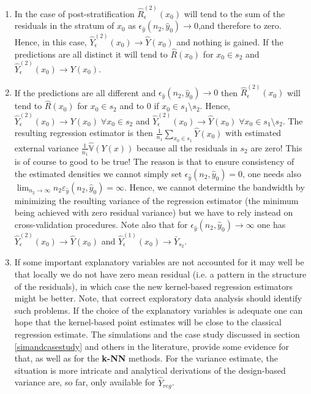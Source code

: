 \documentclass[a4paper,12pt,leqno, titlepage]{article}
\newcommand{\VAR}{\mathbb{V}}
\begin{document}
 \begin{enumerate}
 \item
 In the case of post-stratification $\hat{R}^{(2)}_{\epsilon}(x_0)$ will tend to the sum of the residuals in the stratum of $x_0$ as $\epsilon_{\hat{y}}(n_2,\hat{y}_0)\to 0$,and therefore to zero. Hence, in this case, $\hat{Y}^{(2)}_{\epsilon}(x_0)\to \hat{Y}(x_0)$ and nothing is gained.  If the predictions are all distinct it will tend to $\hat{R}(x_0)$ for $x_0\in{s_2}$ and
 $\hat{Y}^{(2)}_{\epsilon}(x_0)\to Y(x_0)$.
 \item
 If the predictions are all different and $\epsilon_{\hat{y}}(n_2,\hat{y}_0)\to 0$ then $\hat{R}^{(2)}_{\epsilon}(x_0)$ will tend to $\hat{R}(x_0)$ for $x_0\in{s_2}$ and to $0$ if $x_0\in{s_1\setminus s_2}$. Hence, $\hat{Y}^{(2)}_{\epsilon}(x_0)\rightarrow Y(x_0) \;\forall x_0\in{s_2}$ and $\hat{Y}^{(2)}_{\epsilon}(x_0)\rightarrow \hat{Y}(x_0) \;\forall x_0\in{s_1\setminus s_2}$. The resulting regression estimator is then $\frac{1}{n_1}\sum_{x_0\in{s_1}}\hat{Y}(x_0)$ with estimated external variance $\frac{1}{n_1}\hat{\VAR}(Y(x))$ because all the residuals in $s_2$ are zero! This is of course to good to be true! The reason is that to ensure consistency of the estimated densities we cannot simply set $\epsilon_{\hat{y}}(n_2,\hat{y}_0)=0$, one needs also
$\lim_{n_2\to\infty}n_2\varepsilon_{\hat{y}}(n_2,\hat{y}_0)=\infty$. Hence, we cannot determine the bandwidth by minimizing the resulting variance of the regression estimator (the minimum being achieved with zero residual variance) but we have to rely instead on cross-validation procedures. Note also that for $\epsilon_{\hat{y}}(n_2,\hat{y}_0)\to \infty$ one has $\hat{Y}^{(2)}_{\epsilon}(x_0)\to \hat{Y}(x_0)$ and $\hat{Y}^{(1)}_{\epsilon}(x_0)\to \bar{Y}_{s_2}$.
 \item
  If some important explanatory variables are not accounted for it may well be that locally we do not have zero mean residual (i.e. a pattern in the structure of the residuals), in which case the new kernel-based regression estimators might be better. Note, that correct exploratory data analysis should identify such problems. If the choice of the explanatory variables is adequate one can hope that the kernel-based point estimates will be close to the classical regression estimate. The simulations and the case study discussed in section \ref{simandcasestudy} and others in the literature, provide some evidence for that, as well as for the \textbf{k-NN} methods. For the variance estimate, the situation is more intricate and analytical derivations of the design-based variance are, so far, only available for $\hat{Y}_{reg}$.

 \end{enumerate}
\end{document}

